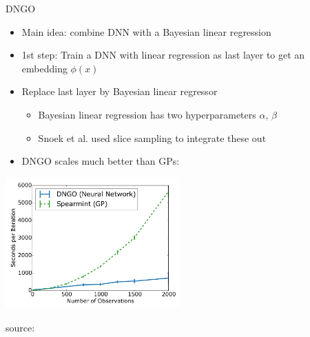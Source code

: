 \begin{frame}[c,fragile]{DNGO~}

\begin{itemize}
	\item Main idea: combine DNN with a Bayesian linear regression
	\smallskip 
	\pause
	\item 1st step: Train a DNN with linear regression as last layer to get an embedding $\phi(x)$
	\smallskip
	\pause
	\item Replace last layer by Bayesian linear regressor
	\begin{itemize}
		\item Bayesian linear regression has two hyperparameters $\alpha$, $\beta$ 
		\item Snoek et al. used slice sampling to integrate these out
	\end{itemize}
	\pause
	\item DNGO scales much better than GPs: 
\end{itemize}

\centering
\includegraphics[width=0.5\textwidth]{images/dngo_scaling.png}
\begin{flushright}
	source: 
\end{flushright}

\end{frame}
